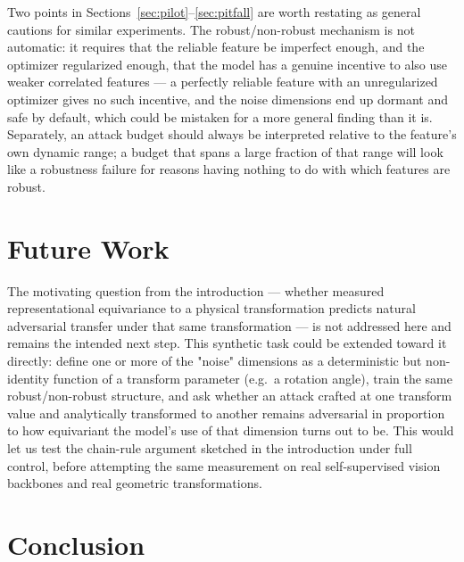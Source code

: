 \documentclass[11pt]{article}
\begin{document}
Two points in Sections~\ref{sec:pilot}--\ref{sec:pitfall} are worth
restating as general cautions for similar experiments. The robust/non-robust
mechanism is not automatic: it requires that the reliable feature be
imperfect enough, and the optimizer regularized enough, that the model has
a genuine incentive to also use weaker correlated features --- a perfectly
reliable feature with an unregularized optimizer gives no such incentive,
and the noise dimensions end up dormant and safe by default, which could be
mistaken for a more general finding than it is. Separately, an attack
budget should always be interpreted relative to the feature's own dynamic
range; a budget that spans a large fraction of that range will look like a
robustness failure for reasons having nothing to do with which features are
robust.

\section{Future Work}

The motivating question from the introduction --- whether measured
representational equivariance to a physical transformation predicts natural
adversarial transfer under that same transformation --- is not addressed
here and remains the intended next step. This synthetic task could be
extended toward it directly: define one or more of the "noise" dimensions
as a deterministic but non-identity function of a transform parameter
(e.g.\ a rotation angle), train the same robust/non-robust structure, and
ask whether an attack crafted at one transform value and analytically
transformed to another remains adversarial in proportion to how
equivariant the model's use of that dimension turns out to be. This would
let us test the chain-rule argument sketched in the introduction under full
control, before attempting the same measurement on real self-supervised
vision backbones and real geometric transformations.

\section{Conclusion}
\end{document}
